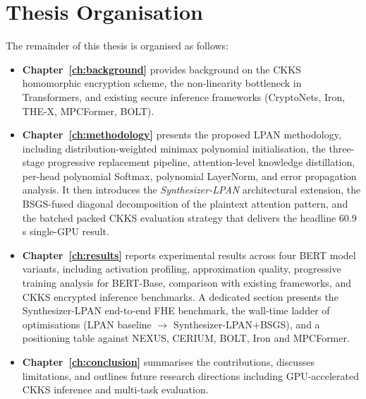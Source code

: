 \section{Thesis Organisation}

The remainder of this thesis is organised as follows:

\begin{itemize}
    \item \textbf{Chapter~\ref{ch:background}} provides background on the CKKS homomorphic encryption scheme, the non-linearity bottleneck in Transformers, and existing secure inference frameworks (CryptoNets, Iron, THE-X, MPCFormer, BOLT).

    \item \textbf{Chapter~\ref{ch:methodology}} presents the proposed LPAN methodology, including distribution-weighted minimax polynomial initialisation, the three-stage progressive replacement pipeline, attention-level knowledge distillation, per-head polynomial Softmax, polynomial LayerNorm, and error propagation analysis. It then introduces the \emph{Synthesizer-LPAN} architectural extension, the BSGS-fused diagonal decomposition of the plaintext attention pattern, and the batched packed CKKS evaluation strategy that delivers the headline 60.9\,s single-GPU result.

    \item \textbf{Chapter~\ref{ch:results}} reports experimental results across four BERT model variants, including activation profiling, approximation quality, progressive training analysis for BERT-Base, comparison with existing frameworks, and CKKS encrypted inference benchmarks. A dedicated section presents the Synthesizer-LPAN end-to-end FHE benchmark, the wall-time ladder of optimisations (LPAN baseline $\to$ Synthesizer-LPAN+BSGS), and a positioning table against NEXUS, CERIUM, BOLT, Iron and MPCFormer.

    \item \textbf{Chapter~\ref{ch:conclusion}} summarises the contributions, discusses limitations, and outlines future research directions including GPU-accelerated CKKS inference and multi-task evaluation.
\end{itemize}
